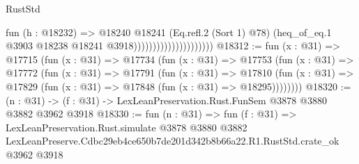 \begin{lexlean}{RustStd}
\begin{coremodule}
                                          fun (h : @18232) =>
                                          @18240
                                            @18241
                                            (Eq.refl.{2} (Sort 1) @78)
                                            (heq_of_eq.{1}
                                              @3903
                                              @18238
                                              @18241
                                              @3918)))))))))))))))))))))
@18312 := fun (x : @31) =>
  @17715
    (fun (x : @31) =>
    @17734
      (fun (x : @31) =>
      @17753
        (fun (x : @31) =>
        @17772
          (fun (x : @31) =>
          @17791
            (fun (x : @31) =>
            @17810
              (fun (x : @31) => @17829 (fun (x : @31) => @17848 (fun (x : @31) => @18295))))))))
@18320 := (n : @31) -> (f : @31) -> LexLeanPreservation.Rust.FunSem @3878 @3880 @3882 @3962 @3918
@18330 := fun (n : @31) =>
  fun (f : @31) =>
  LexLeanPreservation.Rust.simulate
    @3878
    @3880
    @3882
    LexLeanPreserve.Cdbc29eb4ce650b7de201d342b8b66a22.R1.RustStd.crate_ok
    @3962
    @3918
\end{coremodule}
\end{lexlean}
